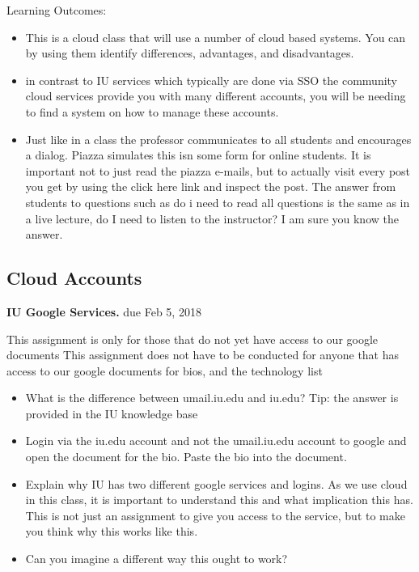 Learning Outcomes:
\begin{itemize}
\item This is a cloud class that will use a number of cloud based
  systems. You can by using them identify differences, advantages, and
  disadvantages.
\item in contrast to IU services which typically are done via SSO the
  community cloud services provide you with many different accounts,
  you will be needing to find a system on how to manage these
  accounts.
\item Just like in a class the professor communicates to all students
  and encourages a dialog. Piazza simulates this isn some form for
  online students. It is important not to just read the piazza
  e-mails, but to actually visit every post you get by using the click
  here link and inspect the post. The answer from students to
  questions such as do i need to read all questions is the same as in
  a live lecture, do I need to listen to the instructor? I am sure you
  know the answer.
\end{itemize}


\subsection{Cloud Accounts}
\label{E:e222-iu-google-services}

\begin{exercise}\label{E:e222-iu-google}

  {\bf IU Google Services.} due Feb 5, 2018
  
  This assignment is only for those that do
  not yet have access to our google documents This assignment does not
  have to be conducted for anyone that has access to our google
  documents for bios, and the technology list

  \begin{itemize}
 
  \item What is the difference between umail.iu.edu and iu.edu? Tip:
    the answer is provided in the IU knowledge base

  \item Login via the iu.edu account and not the umail.iu.edu account
    to google and open the document for the bio. Paste the bio into
    the document.

  \item Explain why IU has two different google services and
    logins. As we use cloud in this class, it is important to
    understand this and what implication this has. This is not just an
    assignment to give you access to the service, but to make you
    think why this works like this.

  \item Can you imagine a different way this ought to work?

  \end{itemize}

\end{exercise}

